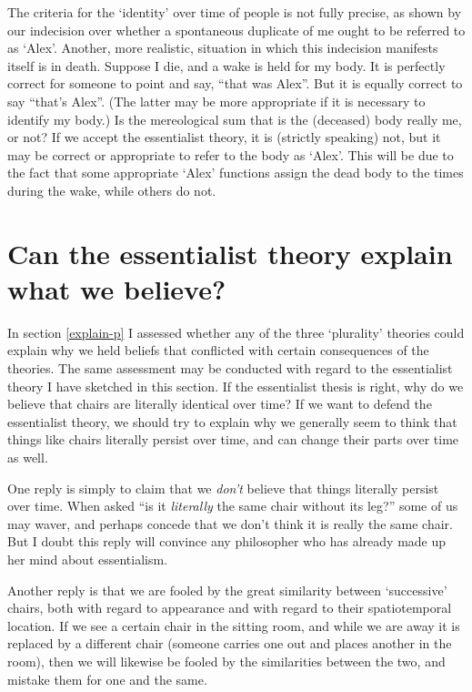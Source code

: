 \documentclass[11pt]{article}
\begin{document}
\begin{spacing}{1.5}
The criteria for the `identity' over time of people is not fully
precise, as shown by our indecision over whether a spontaneous
duplicate of me ought to be referred to as `Alex'.  Another, more
realistic, situation in which this indecision manifests itself is in
death.  Suppose I die, and a wake is held for my body.  It is
perfectly correct for someone to point and say, ``that was Alex''.
But it is equally correct to say ``that's Alex''.  (The latter may be
more appropriate if it is necessary to identify my body.)  Is the
mereological sum that is the (deceased) body really me, or not?  If we
accept the essentialist theory, it is (strictly speaking) not, but it
may be correct or appropriate to refer to the body as `Alex'.  This
will be due to the fact that some appropriate `Alex' functions assign
the dead body to the times during the wake, while others do not.

\section{Can the essentialist theory explain what we believe?}
\label{explain-e}
In section \ref{explain-p} I assessed whether any of the three
`plurality' theories could explain why we held beliefs that conflicted
with certain consequences of the theories.  The same assessment may
be conducted with regard to the essentialist theory I have sketched in
this section.  If the essentialist thesis is right, why do we believe
that chairs are literally identical over time?  If we want to defend
the essentialist theory, we should try to explain why we generally
seem to think that things like chairs literally persist over time, and
can change their parts over time as well.

One reply is simply to claim that we {\em don't} believe that things
literally persist over time.  When asked ``is it {\em literally} the
same chair without its leg?'' some of us may waver, and perhaps
concede that we don't think it is really the same chair.  But I doubt
this reply will convince any philosopher who has already made up her
mind about essentialism.

Another reply is that we are fooled by the great similarity between
`successive' chairs, both with regard to appearance and with regard to
their spatiotemporal location.  If we see a certain chair in the
sitting room, and while we are away it is replaced by a different
chair (someone carries one out and places another in the room), then
we will likewise be fooled by the similarities between the two, and
mistake them for one and the same.


\end{spacing}
\end{document}
